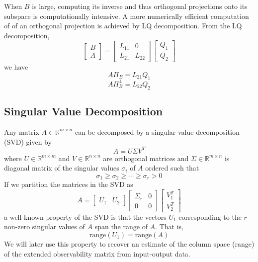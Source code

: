 When $B$ is large, computing its inverse and thus orthogonal projections onto its subspace is computationally intensive. A more numerically efficient computation of of an orthogonal projection is achieved by LQ decomposition. From the LQ decomposition,
\begin{equation*}
\begin{bmatrix}B\\A\end{bmatrix} = 
\begin{bmatrix}L_{11} & 0\\ L_{21} & L_{22}\end{bmatrix}
\begin{bmatrix}Q_1\\ Q_2\end{bmatrix}
\end{equation*}
we have
\begin{equation*}
A\Pi_B = L_{21}Q_1
\end{equation*}
\begin{equation*}
A\Pi_B^\perp = L_{22}Q_2
\end{equation*}

\subsection{Singular Value Decomposition}
Any matrix $A \in \mathbb{R}^{m\times n}$ can be decomposed by a singular value decomposition (SVD) given by
\begin{equation*}
A = U\Sigma V^T
\end{equation*}
where $U \in \mathbb{R}^{m\times m}$ and $V \in \mathbb{R}^{n\times n}$ are orthogonal matrices and $\Sigma \in \mathbb{R}^{m\times n}$ is diagonal matrix of the singular values $\sigma_i$ of $A$ ordered such that
\begin{equation*}
\sigma_1 \geq \sigma_2 \geq \cdots \geq \sigma_r > 0
\end{equation*}
If we partition the matrices in the SVD as
\begin{equation*}
A = \left[\begin{array}{c|c}
U_1 & U_2
\end{array}\right]
\left[\begin{array}{c|c}
\Sigma_r & 0 \\ \hline 0 & 0
\end{array}\right]
\left[\begin{array}{c}
V_1^T \\ \hline V_2^T
\end{array}\right]
\end{equation*}
a well known property of the SVD is that the vectors $U_1$ corresponding to the $r$ non-zero singular values of $A$ span the range of $A$. That is,
\begin{equation*}
\mbox{range}(U_1) = \mbox{range}(A)
\end{equation*}
We will later use this property to recover an estimate of the column space (range) of the extended observability matrix from input-output data.

